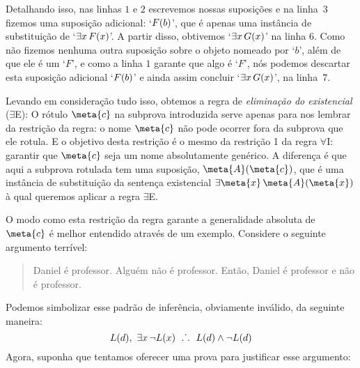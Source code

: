 Detalhando isso, nas linhas $1$ e $2$ escrevemos nossas suposições e na linha~$3$ fizemos uma suposição adicional: `$\mathord{F}(b)$', que é apenas uma instância de substituição de `$\exists x\,\mathord{F}(x)$'. A partir disso, obtivemos `$\exists x\,\mathord{G}(x)$' na linha $6$. Como não fizemos nenhuma outra suposição sobre o objeto nomeado por `$b$', além de que ele é um `$F$', e como a linha $1$ garante que algo é `$F$', nós podemos descartar esta suposição adicional `$\mathord{F}(b)$' e ainda assim concluir `$\exists x\,\mathord{G}(x)$', na linha~$7$.

Levando em consideração tudo isso, obtemos a regra de \textit{eliminação  do existencial} ($\exists$E):
O rótulo $\meta{c}$ na subprova introduzida serve apenas para nos lembrar da restrição da regra: o nome $\meta{c}$ não pode ocorrer fora da subprova que ele rotula.
E o objetivo desta restrição é o mesmo da restrição 1 da regra $\forall$I: garantir que $\meta{c}$ seja um nome absolutamente genérico.
A diferença é que aqui a subprova rotulada tem uma suposição, $\meta{A}(\meta{c})$, que é uma instância de substituição da sentença existencial $\exists \meta{x}\,\meta{A}(\meta{x})$ à qual queremos aplicar a regra $\exists$E.

O modo como esta restrição da regra garante a generalidade absoluta de $\meta{c}$ é melhor entendido através de um exemplo. Considere o seguinte argumento terrível:
	\begin{quote}
		Daniel é professor. Alguém não é professor. Então, Daniel é professor e não é professor.
	\end{quote}
Podemos simbolizar esse padrão de inferência, obviamente inválido, da seguinte maneira:
$$\mathord{L}(d),\,\, \exists x\, \neg\mathord{L}(x) \ \mathrel{\ldotp\dot{}\,\ldotp} \ \mathord{L}(d) \wedge \neg \mathord{L}(d)$$
Agora, suponha que tentamos oferecer uma prova para justificar esse argumento:


